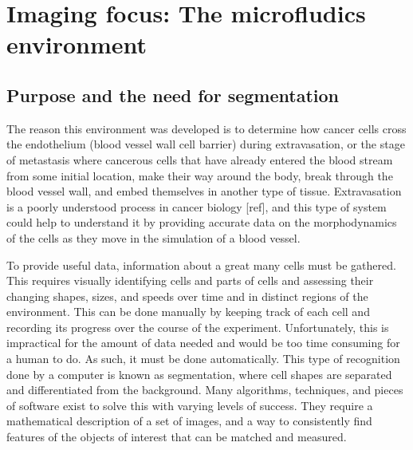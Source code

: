 
\chapter{Imaging focus: The microfludics environment}

\ifpdf
    \graphicspath{{Chapter2/Figs/Raster/}{Chapter2/Figs/PDF/}{Chapter2/Figs/}}
\else
    \graphicspath{{Chapter2/Figs/Vector/}{Chapter2/Figs/}}
\fi

\section{Purpose and the need for segmentation}

The reason this environment was developed is to determine how cancer cells cross the endothelium (blood vessel wall cell barrier) during extravasation, or the stage of metastasis where cancerous cells that have already entered the blood stream from some initial location, make their way around the body, break through the blood vessel wall, and embed themselves in another type of tissue. Extravasation is a poorly understood process in cancer biology [ref], and this type of system could help to understand it by providing accurate data on the morphodynamics of the cells as they move in the simulation of a blood vessel.

To provide useful data, information about a great many cells must be gathered. This requires visually identifying cells and parts of cells and assessing their changing shapes, sizes, and speeds over time and in distinct regions of the environment. This can be done manually by keeping track of each cell and recording its progress over the course of the experiment. Unfortunately, this is impractical for the amount of data needed and would be too time consuming for a human to do. As such, it must be done automatically. This type of recognition done by a computer is known as segmentation, where cell shapes are separated and differentiated from the background. Many algorithms, techniques, and pieces of software exist to solve this with varying levels of success. They require a mathematical description of a set of images, and a way to consistently find features of the objects of interest that can be matched and measured.

